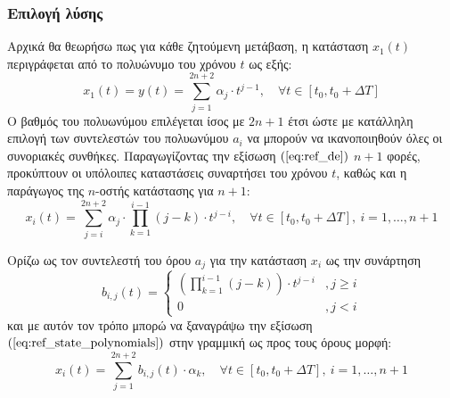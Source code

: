 \subsubsection{Επιλογή λύσης} \label{subseq:ref_parameterization}
Αρχικά θα θεωρήσω πως για κάθε ζητούμενη μετάβαση, η κατάσταση $x_1(t)$ περιγράφεται από το πολυώνυμο του χρόνου $t$ ως εξής:
\begin{equation}
	x_1(t) = y(t) = \sum_{j=1}^{2n + 2} \alpha_j \cdot t^{j-1},\quad \forall t \in [t_0,t_0+\Delta T]
	\label{eq:ref_de}
\end{equation}
Ο βαθμός του πολυωνύμου επιλέγεται ίσος με $2n + 1$ έτσι ώστε με κατάλληλη επιλογή των συντελεστών του πολυωνύμου $a_i$ να μπορούν να ικανοποιηθούν όλες οι συνοριακές συνθήκες. Παραγωγίζοντας την εξίσωση $(\ref{eq:ref_de})$ $n+1$ φορές, προκύπτουν οι υπόλοιπες καταστάσεις συναρτήσει του χρόνου $t$, καθώς και η παράγωγος της $n$-οστής κατάστασης για $n+1$: 
\begin{equation}
x_i(t) = \sum_{j=i}^{2n + 2} \alpha_j \cdot \prod_{k = 1}^{i-1} (j-k) 
 \cdot t^{j-i},\quad \forall t \in [t_0,t_0+\Delta T], \: i = 1,\dots, n+1
\label{eq:ref_state_polynomials}
\end{equation}

Ορίζω ως τον συντελεστή του όρου $a_j$ για την κατάσταση $x_i$ ως την συνάρτηση
\begin{equation}
	b_{i,j}(t) = \begin{cases}
	\left( \prod_{k = 1}^{i-1} (j-k) \right)
	\cdot t^{j-i} &, j \geq i \\
	0 &, j < i 
	\end{cases}
	\label{eq:ref_system_coefficients}
\end{equation}
και με αυτόν τον τρόπο μπορώ να ξαναγράψω την εξίσωση $(\ref{eq:ref_state_polynomials})$ στην γραμμική ως προς τους όρους μορφή:
\begin{equation}
x_i(t) = \sum_{j=1}^{2n + 2} b_{i,j}(t) \cdot \alpha_k 
,\quad \forall t \in [t_0,t_0+\Delta T], \: i = 1,\dots, n+1
\end{equation}

